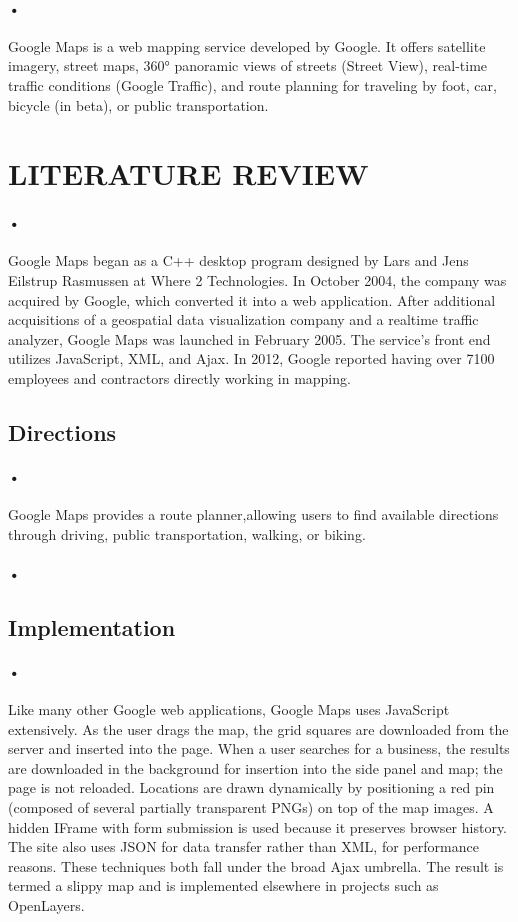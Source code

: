\documentclass[7pt]{article}
\begin{document}
\paragraph{•}
Google Maps is a web mapping service developed by Google. It offers satellite imagery, street maps, 360° panoramic views of streets (Street View), real-time traffic conditions (Google Traffic), and route planning for traveling by foot, car, bicycle (in beta), or public transportation.
\section*{LITERATURE REVIEW}
\paragraph{•}
Google Maps began as a C++ desktop program designed by Lars and Jens Eilstrup Rasmussen at Where 2 Technologies. In October 2004, the company was acquired by Google, which converted it into a web application. After additional acquisitions of a geospatial data visualization company and a realtime traffic analyzer, Google Maps was launched in February 2005. The service's front end utilizes JavaScript, XML, and Ajax. 
In 2012, Google reported having over 7100 employees and contractors directly working in mapping.
\cite{sharma}
\subsection*{Directions}
\paragraph{•}
Google Maps provides a route planner,allowing users to find available directions through driving, public transportation, walking, or biking.
\paragraph{•}
\subsection*{Implementation}
\paragraph{•}
Like many other Google web applications, Google Maps uses JavaScript extensively. As the user drags the map, the grid squares are downloaded from the server and inserted into the page. When a user searches for a business, the results are downloaded in the background for insertion into the side panel and map; the page is not reloaded. Locations are drawn dynamically by positioning a red pin (composed of several partially transparent PNGs) on top of the map images. A hidden IFrame with form submission is used because it preserves browser history. The site also uses JSON for data transfer rather than XML, for performance reasons. These techniques both fall under the broad Ajax umbrella. The result is termed a slippy map and is implemented elsewhere in projects such as OpenLayers.
\cite{Likhith P}
\end{document}
